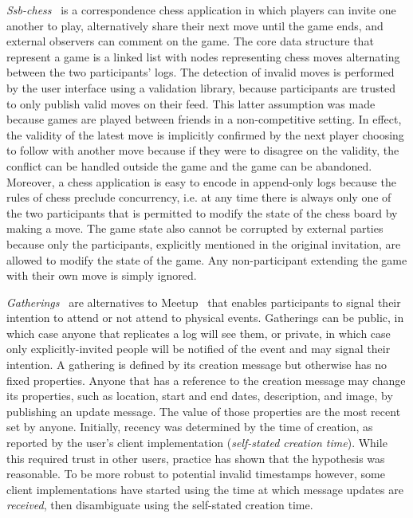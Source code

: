 \documentclass[sigconf]{acmart}
\begin{document}
\textit{Ssb-chess}~\cite{ssb-chess} is a correspondence chess application in
which players can invite one another to play, alternatively share their next
move until the game ends, and external observers can comment on the game. The
core data structure that represent a game is a linked list with nodes
representing chess moves alternating between the two participants' logs. The
detection of invalid moves is performed by the user interface using a
validation library, because participants are trusted to only publish valid
moves on their feed. This latter assumption was made because games are played
between friends in a non-competitive setting. In effect, the validity of the
latest move is implicitly confirmed by the next player choosing to follow with
another move because if they were to disagree on the validity, the conflict can
be handled outside the game and the game can be abandoned. Moreover, a chess
application is easy to encode in append-only logs because the rules of chess
preclude concurrency, i.e. at any time there is always only one of the two
participants that is permitted to modify the state of the chess board by making
a move. The game state also cannot be corrupted by external parties because
only the participants, explicitly mentioned in the original invitation, are
allowed to modify the state of the game. Any non-participant extending the game
with their own move is simply ignored.

\textit{Gatherings}~\cite{patch-gatherings} are alternatives to
Meetup~\cite{meetup.com} that enables participants to signal their intention to
attend or not attend to physical events. Gatherings can be public, in which
case anyone that replicates a log will see them, or private, in which case only
explicitly-invited people will be notified of the event and may signal their
intention. A gathering is defined by its creation message but otherwise has no
fixed properties. Anyone that has a reference to the creation message may
change its properties, such as location, start and end dates, description, and
image, by publishing an update message. The value of those properties are the
most recent set by anyone. Initially, recency was determined by the time of
creation, as reported by the user's client implementation (\textit{self-stated
creation time}). While this required trust in other users, practice has shown
that the hypothesis was reasonable. To be more robust to potential invalid
timestamps however, some client implementations have started using the time at
which message updates are \textit{received}, then disambiguate using the
self-stated creation time.
\end{document}
